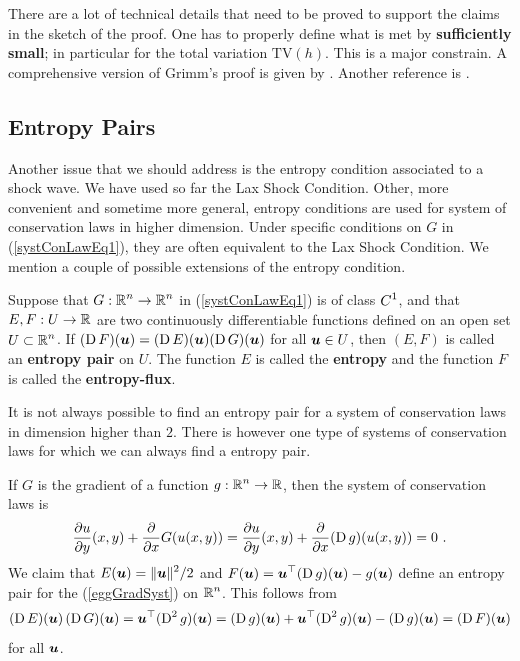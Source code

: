 There are a lot of technical details that need to be proved to support
the claims in the sketch of the proof.  One has to properly define what 
is met by {\bfseries sufficiently small}; in particular for the total
variation $\text{TV}(h)$.  This is a major constrain.
A comprehensive version of Grimm's proof is given by \cite{Smo}.
Another reference is \cite{LeF}.

\subsection{Entropy Pairs}

Another issue that we should address is the entropy condition
associated to a shock wave.  We have used so far the Lax Shock
Condition.  Other, more convenient and sometime more general, entropy
conditions are used for system of conservation laws in higher
dimension.  Under specific conditions on $G$ in (\ref{systConLawEq1}),
they are often equivalent to the Lax Shock Condition.  We mention a
couple of possible extensions of the entropy condition.

\begin{defn}
Suppose that $\DS G:\RR^n \to \RR^n$ in
(\ref{systConLawEq1}) is of class $\DS C^1$, and that
$E,F:U\to \RR$ are two continuously differentiable
functions defined on an open set $\DS U \subset \RR^n$.  If
$(\diff F)(\VEC{u}) = (\diff E)(\VEC{u}) (\diff G)(\VEC{u})$ for all
$\VEC{u} \in U$,
then $(E,F)$ is called an {\bfseries entropy pair} on $U$.  The function $E$ is called the
{\bfseries entropy} and the function
$F$ is called the {\bfseries entropy-flux}.
\end{defn}

\begin{egg}
It is not always possible to find an entropy pair for a system of
conservation laws in dimension higher than $2$.  There is however one
type of systems of conservation laws for which we can always find a
entropy pair.

If $G$ is the gradient of a function $\DS g:\RR^n \to \RR$,
then the system of conservation laws is
\begin{equation} \label{eggGradSyst}
\pdydx{u}{y}(x,y) + \pdfdx{G(u(x,y))}{x}
= \pdydx{u}{y}(x,y) + \pdfdx{(\diff g)(u(x,y))}{x} = 0 \ .
\end{equation}
We claim that $\DS E(\VEC{u}) = \|\VEC{u}\|^2/2$ and
$\DS F(\VEC{u}) = \VEC{u}^\top (\diff g)(\VEC{u}) - g(\VEC{u})$
define an entropy pair for the (\ref{eggGradSyst}) on
$\DS \RR^n$.  This follows
from
\[
(\diff E)(\VEC{u})\, (\diff G)(\VEC{u})
= \VEC{u}^\top (\diff^2 g)(\VEC{u})
= (\diff g)(\VEC{u}) + \VEC{u}^\top (\diff^2 g)(\VEC{u}) - (\diff g)(\VEC{u})
= (\diff F)(\VEC{u})
\]
for all $\VEC{u}$.
\end{egg}

